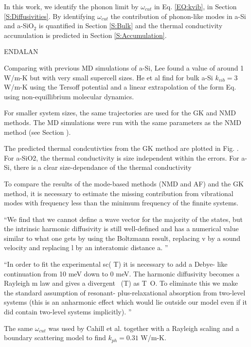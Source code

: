 \documentclass[aps,prb,onecolumn,preprint,superscriptaddress,footinbib,amsmath,amssymb,floatfix]{revtex4}
\begin{document}
In this work, we identify the phonon limit by $\omega_{cut}$ in 
Eq. \eqref{EQ:kvib}, 
in Section \ref{S:Diffusivities}. By identifying $\omega_{cut}$   
the contribution of phonon-like modes in a-Si and 
a-SiO$_2$ is quantified in Section \ref{S:Bulk} and 
the thermal conductivity accumulation 
is predicted in Section \ref{S:Accumulation}. 


 
ENDALAN 

Comparing with previous MD simulations of a-Si, 
Lee found a value of around 1 W/m-K 
but with very small supercell sizes.\cite{lee_molecular-dynamics_1991}
He et al find for bulk a-Si $k_{vib} = 3$ W/m-K using the Tersoff 
potential and a linear extrapolation of the form Eq. using 
non-equillibrium molecular dynamics. 

For smaller system sizes, the same trajectories are used for the GK and 
NMD methods. The MD simulations were run with the same parameters 
as the NMD method (see Section ). 

The predicted thermal condcutivties from the GK method are plotted 
in Fig. . For a-SiO2, the thermal conductivity is size independent 
within the errors.  For a-Si, there is a clear size-dependance of the 
thermal conductivity

To compare the results of the mode-based methods (NMD and AF) and 
the GK method, it is necessary to estimate the missing contribution from 
vibrational modes with frequency less than the minimum frequency of 
the finnite systems. 



``We find that we cannot define a wave vector for the
majority of the states, but the intrinsic harmonic diffusivity is still well-defined and has a numerical value
similar to what one gets by using the Boltzmann result, replacing v by a sound velocity and replacing l by
an interatomic distance a.
''\cite{feldman_thermal_1993}

``In order to fit the experimental sc( T) it is necessary to add a Debye-
like continuation from 10 meV down to 0 meV. The harmonic diffusivity becomes a Rayleigh m
law
and gives a divergent ~(T) as T~O. To eliminate this we make the standard assumption of resonant-
plus-relaxational absorption from two-level systems (this is an anharmonic effect which would lie outside
our model even if it did contain two-level systems implicitly).
''\cite{feldman_thermal_1993}

The same $\omega_{cut}$ was used by Cahill et al. 
together with a Rayleigh scaling and a boundary scattering model to 
find $k_{ph} = 0.31$ W/m-K.\cite{cahill_thermal_1994} 
\end{document}
